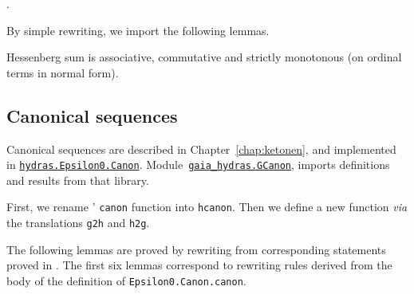 \vspace{4pt} 
\noindent.


By simple rewriting, we import the following lemmas.




Hessenberg sum is associative, commutative and strictly monotonous (on ordinal terms in normal form).


\subsection{Canonical sequences}
\label{sect:gcanon}
Canonical sequences are described in Chapter~\vref{chap:ketonen}, and implemented in
\href{../theories/html/hydras.Epsilon0.Canon.html}%
{\texttt{hydras.Epsilon0.Canon}}.
Module~\href{../theories/html/gaia_hydras.GCanon.html}%
{\texttt{gaia\_hydras.GCanon}}, imports definitions and results from that library.



First, we rename \HydrasLib' \texttt{canon} function into
\texttt{hcanon}. Then we define a new function \emph{via} the
translations \texttt{g2h} and \texttt{h2g}.




The following lemmas are proved by rewriting from corresponding statements proved in \HydrasLib. The first six lemmas correspond to rewriting rules derived from the body of the definition of \texttt{Epsilon0.Canon.canon}.









